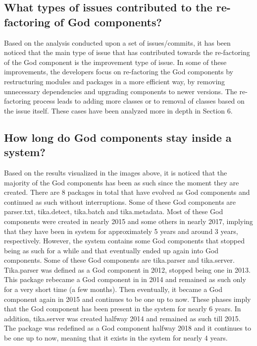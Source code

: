 \documentclass{article}
\begin{document}
\subsection{What types of issues contributed to the re-factoring of God components?}
Based on the analysis conducted upon a set of issues/commits, it has been noticed that the main type of issue that has contributed towards the re-factoring of the God component is the improvement type of issue. In some of these improvements, the developers focus on re-factoring the God components by restructuring modules and packages in a more efficient way, by removing unnecessary dependencies and upgrading components to newer versions. The re-factoring process leads to adding more classes or to removal of classes based on the issue itself. These cases have been analyzed more in depth in Section 6. 
\subsection{How long do God components stay inside a system?}
Based on the results visualized in the images above, it is noticed that the majority of the God components has been as such since the moment they are created. There are 8 packages in total that have evolved as God components and continued as such without interruptions. Some of these God components are parser.txt, tika.detect, tika.batch and tika.metadata. Most of these God components were created in nearly 2015 and some others in nearly 2017, implying that they have been in system for approximately 5 years and around 3 years, respectively. However, the system contains some God components that stopped being as such for a while and that eventually ended up again into God components. Some of these God components are tika.parser and tika.server. Tika.parser was defined as a God component in 2012, stopped being one in 2013. This package rebecame a God component in in 2014 and remained as such only for a very short time (a few months). Then eventually, it became a God component again in 2015 and continues to be one up to now. These phases imply that the God component has been present in the system for nearly 6 years. In addition, tika.server was created halfway 2014 and remained as such till 2015. The package was redefined as a God component halfway 2018 and it continues to be one up to now, meaning that it exists in the system for nearly 4 years.\\
\end{document}
